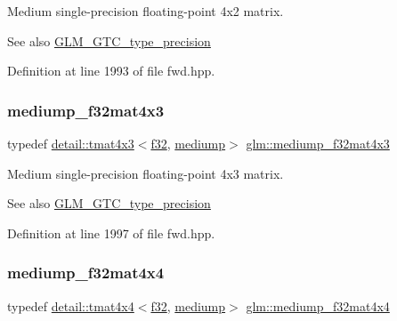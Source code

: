 Medium single-\/precision floating-\/point 4x2 matrix. \begin{DoxySeeAlso}{See also}
\hyperlink{group__gtc__type__precision}{G\+L\+M\+\_\+\+G\+T\+C\+\_\+type\+\_\+precision} 
\end{DoxySeeAlso}


Definition at line 1993 of file fwd.\+hpp.

\mbox{\label{group__gtc__type__precision_ga31635d753ab8a19fdaa80d2b89e90c54}} 
\subsubsection{\texorpdfstring{mediump\+\_\+f32mat4x3}{mediump\_f32mat4x3}}
{\footnotesize\ttfamily typedef \hyperlink{structglm_1_1detail_1_1tmat4x3}{detail\+::tmat4x3}$<$\hyperlink{group__gtc__type__precision_ga0ec999b57f5330d9021256e96038df04}{f32}, \hyperlink{namespaceglm_a0f04f086094c747d227af4425893f545a6416f3ea0c9025fb21ed50c4d6620482}{mediump}$>$ \hyperlink{group__gtc__type__precision_ga31635d753ab8a19fdaa80d2b89e90c54}{glm\+::mediump\+\_\+f32mat4x3}}

Medium single-\/precision floating-\/point 4x3 matrix. \begin{DoxySeeAlso}{See also}
\hyperlink{group__gtc__type__precision}{G\+L\+M\+\_\+\+G\+T\+C\+\_\+type\+\_\+precision} 
\end{DoxySeeAlso}


Definition at line 1997 of file fwd.\+hpp.

\mbox{\label{group__gtc__type__precision_ga8f83086fffe71f9cd15e75a1de101ba6}} 
\subsubsection{\texorpdfstring{mediump\+\_\+f32mat4x4}{mediump\_f32mat4x4}}
{\footnotesize\ttfamily typedef \hyperlink{structglm_1_1detail_1_1tmat4x4}{detail\+::tmat4x4}$<$\hyperlink{group__gtc__type__precision_ga0ec999b57f5330d9021256e96038df04}{f32}, \hyperlink{namespaceglm_a0f04f086094c747d227af4425893f545a6416f3ea0c9025fb21ed50c4d6620482}{mediump}$>$ \hyperlink{group__gtc__type__precision_ga8f83086fffe71f9cd15e75a1de101ba6}{glm\+::mediump\+\_\+f32mat4x4}}

